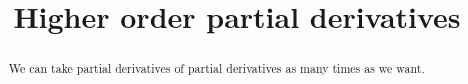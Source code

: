 \documentclass{ximera}
\title{Higher order partial derivatives}
\begin{document}
\begin{abstract}	
	We can take partial derivatives of partial derivatives as many times as we want.
\end{abstract}
\end{document}
